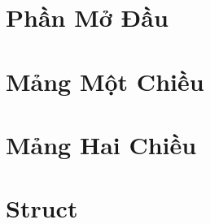 \documentclass[11pt, twoside]{QuantaQuest}
\begin{document}
 
 
\frontmatter
  \onecolumn
  \halftitlepage %
  
  
    
   
   
  \setcounter{page}{0} 
  \pagestyle{fancy-pagenum}   
  \hypertarget{maintoc}{}  
  \maintoc 
 
  
      

\mainmatter    
    \part{Phần Mở Đầu}
        
      
      
      
    \part{Mảng Một Chiều}
      
    \part{Mảng Hai Chiều}
      
      
    \part{Struct}
      
      
    
\appendix
  

\backmatter
  
  

\clearpage
\nocite{*}
\end{document}

